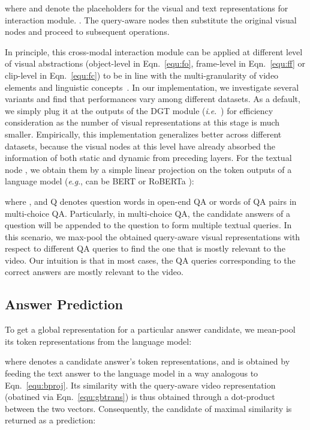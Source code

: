 \documentclass[10pt,journal,compsoc]{IEEEtran}
\newcommand{\ie}{\textit{i}.\textit{e}.}
\newcommand{\eg}{\textit{e}.\textit{g}.}
\begin{document}
where  and  denote the placeholders for the visual and text representations for interaction module. . The query-aware nodes  then substitute the original visual nodes and proceed to subsequent operations. 

In principle, this cross-modal interaction module can be applied at different level of visual abstractions (object-level  in Eqn.~\eqref{equ:fo}, frame-level  in Eqn.~\eqref{equ:ff} or clip-level  in Eqn.~\eqref{equ:fc}) to be in line with the multi-granularity of video elements and linguistic concepts~\cite{xiao2021video}.
In our implementation, we investigate several variants and find that performances vary among different datasets.
As a default, we simply plug it at the outputs of the DGT module (\ie~) for efficiency consideration as the number of visual representations at this stage is much smaller. Empirically, this implementation generalizes better across different datasets, because the visual nodes at this level have already absorbed the information of both static and dynamic from preceding layers. For the textual node , we obtain them by a simple linear projection on the token outputs of a language model (\eg,  can be BERT \cite{devlin2018bert} or RoBERTa \cite{liu2019roberta}):

where , and Q denotes question words in open-end QA or words of QA pairs in multi-choice QA. Particularly, in multi-choice QA, the candidate answers of a question will be appended to the question to form multiple textual queries. In this scenario, we max-pool the obtained query-aware visual representations with respect to different QA queries to find the one that is mostly relevant to the video. Our intuition is that in most cases, the QA queries corresponding to the correct answers are mostly relevant to the video. 

\subsection{Answer Prediction}
\label{sec:ad}
To get a global representation for a particular answer candidate, we mean-pool its token representations from the language model: 

where  denotes a candidate answer's token representations, and is obtained by feeding the text answer to the language model in a way analogous to Eqn.~\eqref{equ:bproj}. Its similarity with the query-aware video representation  (obatined via Eqn.~\eqref{equ:gbtrans}) is thus obtained through a dot-product between the two vectors. Consequently, the candidate of maximal similarity is returned as a prediction:
\end{document}
